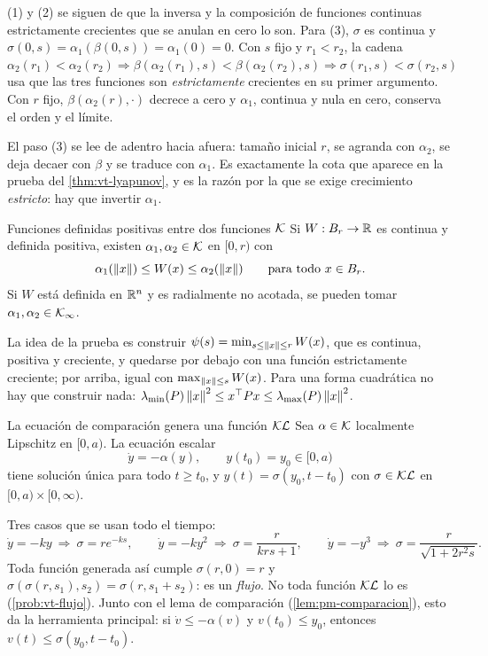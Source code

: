 \begin{demostracion}
(1) y (2) se siguen de que la inversa y la composición de funciones continuas estrictamente crecientes que se anulan en cero lo son. Para (3), $\sigma$ es continua y $\sigma(0,s)=\alpha_1(\beta(0,s))=\alpha_1(0)=0$. Con $s$ fijo y $r_1<r_2$, la cadena $\alpha_2(r_1)<\alpha_2(r_2)\Rightarrow\beta(\alpha_2(r_1),s)<\beta(\alpha_2(r_2),s)\Rightarrow\sigma(r_1,s)<\sigma(r_2,s)$ usa que las tres funciones son \emph{estrictamente} crecientes en su primer argumento. Con $r$ fijo, $\beta(\alpha_2(r),\cdot)$ decrece a cero y $\alpha_1$, continua y nula en cero, conserva el orden y el límite.
\end{demostracion}

El paso (3) se lee de adentro hacia afuera: tamaño inicial $r$, se agranda con $\alpha_2$, se deja decaer con $\beta$ y se traduce con $\alpha_1$. Es exactamente la cota que aparece en la prueba del \cref{thm:vt-lyapunov}, y es la razón por la que se exige crecimiento \emph{estricto}: hay que invertir $\alpha_1$.

\begin{lema}[label=lem:vt-sandwich]{Funciones definidas positivas entre dos funciones $\mathcal{K}$ \citep[Lema~4.3]{Kha02}}
Si $W:B_{r}\to\mathbb{R}$ es continua y definida positiva, existen $\alpha_1,\alpha_2\in\mathcal{K}$ en $[0,r)$ con
\[
  \alpha_1(\left\lVert x\right\rVert)\le W(x)\le\alpha_2(\left\lVert x\right\rVert)\qquad\text{para todo }x\in B_{r} .
\]
Si $W$ está definida en $\mathbb{R}^n$ y es radialmente no acotada, se pueden tomar $\alpha_1,\alpha_2\in\mathcal{K}_{\infty}$.
\end{lema}

La idea de la prueba es construir $\psi(s)=\min_{s\le\left\lVert x\right\rVert\le r}W(x)$, que es continua, positiva y creciente, y quedarse por debajo con una función estrictamente creciente; por arriba, igual con $\max_{\left\lVert x\right\rVert\le s}W(x)$. Para una forma cuadrática no hay que construir nada: $\lambda_{\min}(P)\left\lVert x\right\rVert^2\le x^{\top} Px\le\lambda_{\max}(P)\left\lVert x\right\rVert^2$.

\begin{lema}[label=lem:vt-flujo]{La ecuación de comparación genera una función $\mathcal{KL}$ \citep[Lema~4.4]{Kha02}}
Sea $\alpha\in\mathcal{K}$ localmente Lipschitz en $[0,a)$. La ecuación escalar
\[
  \dot y=-\alpha(y),\qquad y(t_0)=y_0\in[0,a)
\]
tiene solución única para todo $t\ge t_0$, y $y(t)=\sigma(y_0,t-t_0)$ con $\sigma\in\mathcal{KL}$ en $[0,a)\times[0,\infty)$.
\end{lema}

Tres casos que se usan todo el tiempo:
\[
  \dot y=-ky\ \Rightarrow\ \sigma=re^{-ks},\qquad
  \dot y=-ky^2\ \Rightarrow\ \sigma=\frac r{krs+1},\qquad
  \dot y=-y^3\ \Rightarrow\ \sigma=\frac r{\sqrt{1+2r^2s}} .
\]
Toda función generada así cumple $\sigma(r,0)=r$ y $\sigma(\sigma(r,s_1),s_2)=\sigma(r,s_1+s_2)$: es un \emph{flujo}. No toda función $\mathcal{KL}$ lo es (\cref{prob:vt-flujo}). Junto con el lema de comparación (\cref{lem:pm-comparacion}), esto da la herramienta principal: si $\dot v\le-\alpha(v)$ y $v(t_0)\le y_0$, entonces $v(t)\le\sigma(y_0,t-t_0)$.


